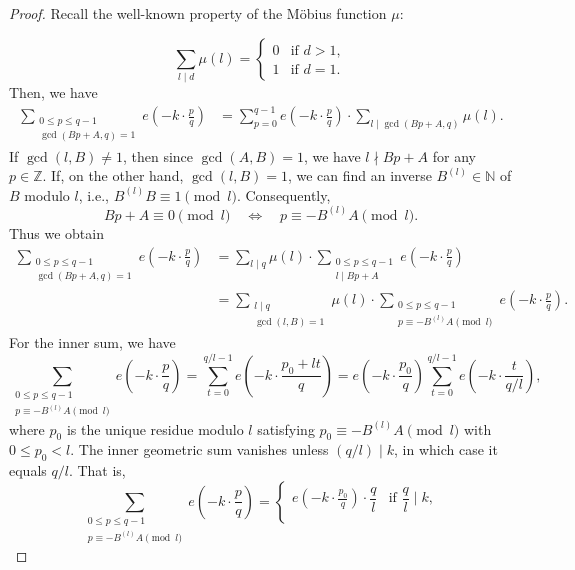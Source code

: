 \documentclass[12pt,a4paper,twoside]{article}
\begin{document}
\begin{proof}
Recall the well-known property of the M\"{o}bius function $\mu\colon$

\[
\sum_{l \mid d} \mu(l) =
\begin{cases}
0 & \text{if } d > 1, \\
1 & \text{if } d = 1.
\end{cases}
\]
Then, we have
\begin{align*}
\sum_{\substack{0\le p\le q-1 \\ \gcd(Bp+A,q)=1}}e(-k\cdot \frac{p}{q})&=\sum_{p=0}^{q-1}e(-k\cdot \frac{p}{q})\cdot\sum_{l\mid \gcd(Bp+A,q)}\mu(l).
\end{align*}
If \(\gcd(l, B) \neq 1\), then since \(\gcd(A, B) = 1\), we have \(l \nmid Bp + A\) for any \(p \in \mathbb{Z}\).
If, on the other hand, \(\gcd(l, B) = 1\), we can find an inverse \(B^{(l)} \in \mathbb{N}\) of \(B\) modulo \(l\), i.e., \(B^{(l)} B \equiv 1 \pmod{l}\). Consequently,
\[
Bp + A \equiv 0 \pmod{l} \quad \iff \quad p \equiv -B^{(l)} A \pmod{l}.
\]
Thus we obtain
\begin{align*}
  \sum_{\substack{0\le p\le q-1 \\ \gcd(Bp+A,q)=1}}e(-k\cdot \frac{p}{q})
  &=\sum_{l\mid q }\mu(l)\cdot\sum_{\substack{0\le p\le q-1 \\ l\mid Bp+A}} e(-k\cdot \frac{p}{q})\\
  &=\sum_{\substack{l\mid q \\ \gcd(l,B)=1}}\mu(l)\cdot\sum_{\substack{0\le p\le q-1 \\ p \equiv -B^{(l)} A\pmod{l}}} e(-k\cdot \frac{p}{q}).
  \end{align*}
For the inner sum, we have
\[
\sum_{\substack{0 \leq p \leq q-1 \\ p \equiv -B^{(l)}A \pmod{l}}} e\!\left(-k \cdot \frac{p}{q}\right)
= \sum_{t=0}^{q/l - 1} e\!\left(-k \cdot \frac{p_0 + lt}{q}\right)
= e\!\left(-k \cdot \frac{p_0}{q}\right) \sum_{t=0}^{q/l - 1} e\!\left(-k \cdot \frac{t}{q/l}\right),
\]
where \(p_0\) is the unique residue modulo \(l\) satisfying \(p_0 \equiv -B^{(l)}A \pmod{l}\) with \(0 \le p_0 < l\).
The inner geometric sum vanishes unless \((q/l) \mid k\), in which case it equals \(q/l\). That is,
\[
\sum_{\substack{0 \leq p \leq q-1 \\ p \equiv -B^{(l)}A \pmod{l}}} e\!\left(-k \cdot \frac{p}{q}\right)
=
\begin{cases}
e\!\left(-k \cdot \frac{p_0}{q}\right) \cdot \dfrac{q}{l} & \text{if } \dfrac{q}{l} \mid k,\\[6pt]


\end{cases}\]
\end{proof}
\end{document}
